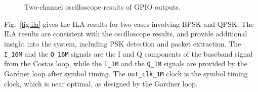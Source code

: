 \documentclass[journal,twoside]{IEEEtran}
\begin{document}
    \begin{figure}[t]
      \\
      \\
      \caption{Two-channel oscilloscope results of GPIO outputs.}
      \label{fig:scope}
    \end{figure}

    Fig.~\ref{fig:ila} gives the ILA results for two cases involving BPSK and QPSK.
    The ILA results are consistent with the oscilloscope results,
    and provide additional insight into the system, including PSK detection and packet extraction.
    The \texttt{I\_16M} and the \texttt{Q\_16M} signals are the I and Q components of the baseband signal from the Costas loop,
    while the \texttt{I\_1M} and the \texttt{Q\_1M} signals are provided by the Gardner loop after symbol timing.
    The \texttt{out\_clk\_1M} clock is the symbol timing clock, which is near optimal, as designed by the Gardner loop.
\end{document}
